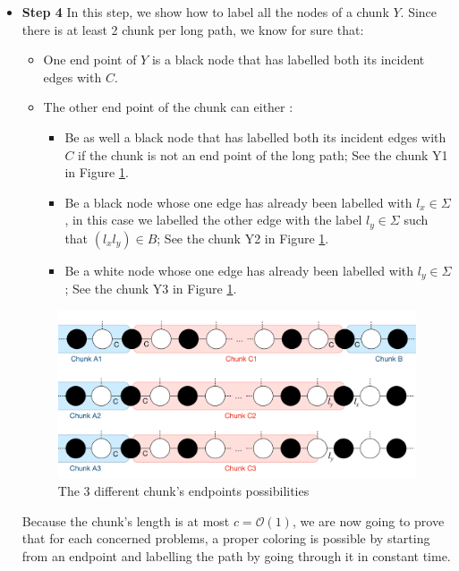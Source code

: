 \begin{itemize}
    Since each chunk boundary happen on a black node $u$, we label both of $u$'s incident edges with C, since $CC$ must be in $B$, this is correct.
    \begin{defi} (Chunk of length n). A chunk of length n is a path of $2n-1$ nodes properly colored. The two endpoints nodes are \textit{black} and have both their incident edge properly labelled. We define \begin{itemize}
        \item L = $X_1X_2$ the edges of one of the endpoint where $X_1$ is incident to a white node not in 
    \end{itemize}
    \end{defi}
    \item \textbf{Step 4}
    In this step, we show how to label all the nodes of a chunk $Y$.
    Since there is at least 2 chunk per long path, we know for sure that:
    \begin{itemize}
        \item One end point of $Y$ is a black node that has labelled both its incident edges with $C$.
        \item The other end point of the chunk can either :
        \begin{itemize}
            \item Be as well a black node that has labelled both its incident edges with $C$ if the chunk is not an end point of the long path; See the chunk Y1 in Figure \ref{fig:global_1}.
            \item Be a black node whose one edge has already been labelled with $l_x\in \Sigma$, in this case we labelled the other edge with the label $l_y\in \Sigma$ such that $(l_xl_y) \in B$; See the chunk Y2 in Figure \ref{fig:global_1}.
            \item Be a white node whose one edge has already been labelled with $l_y\in \Sigma$; See the chunk Y3 in Figure \ref{fig:global_1}.
        \end{itemize}
    \end{itemize}
\begin{figure}[htb]
    \centering
    \includegraphics[scale = 0.22]{Figures/graph_rc.pdf}
    \caption{The 3 different chunk's endpoints possibilities}
    \label{fig:global_1}
\end{figure}
Because the chunk's length is at most $c = \mathcal{O}(1)$, we are now going to prove that for each concerned problems, a proper coloring is possible by starting from an endpoint and labelling the path by going through it in constant time.
\end{itemize}
